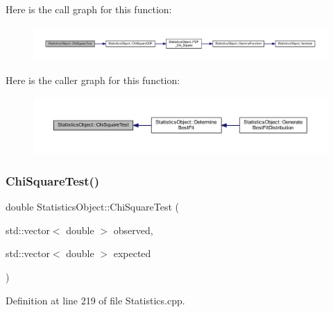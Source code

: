 Here is the call graph for this function\+:\nopagebreak
\begin{figure}[H]
\begin{center}
\leavevmode
\includegraphics[width=350pt]{class_statistics_object_a5f516a6f544714694efc0ba0f925f38c_cgraph}
\end{center}
\end{figure}
Here is the caller graph for this function\+:\nopagebreak
\begin{figure}[H]
\begin{center}
\leavevmode
\includegraphics[width=350pt]{class_statistics_object_a5f516a6f544714694efc0ba0f925f38c_icgraph}
\end{center}
\end{figure}
\mbox{\label{class_statistics_object_a6b3b58d412c68407195df629e2343c6d}} 
\subsubsection{\texorpdfstring{Chi\+Square\+Test()}{ChiSquareTest()}\hspace{0.1cm}{\footnotesize\ttfamily [2/2]}}
{\footnotesize\ttfamily double Statistics\+Object\+::\+Chi\+Square\+Test (\begin{DoxyParamCaption}\item[{std\+::vector$<$ double $>$}]{observed,  }\item[{std\+::vector$<$ double $>$}]{expected }\end{DoxyParamCaption})}



Definition at line 219 of file Statistics.\+cpp.

\mbox{\label{class_statistics_object_a7954e7f69391099bbc33c139149ebb15}} 
